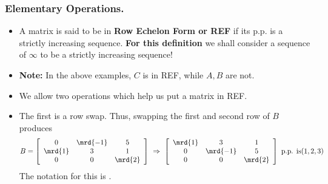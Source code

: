 \begin{frame}%
  \frametitle{Elementary Operations.}
  \begin{itemize}%
 
\item A matrix is said to be in {\bf Row Echelon Form or REF} if its
p.p. is a strictly  increasing sequence.
{\bf For this definition} we shall consider a sequence of $\infty$ to be
a strictly increasing sequence!

\item 
{\bf Note:} In the above examples, $C$ is in REF, while $A,B$ are not.

\item We allow two operations which help us put a matrix in REF.

\item The first is a row swap. Thus, swapping the first and second row
of $B$ produces
$$B= \left[
 \begin{array}{ccc}
 0 & \mrd{-1} & 5 \\
 \mrd{1} & 3 & 1 \\
 0 & 0 & \mrd{2}\\
 \end{array}\right]
 ~\Rightarrow~
 \left[
 \begin{array}{ccc}
 \mrd{1} & 3 & 1 \\
 0 & \mrd{-1} & 5 \\
 0 & 0 &\mrd{2}\\
 \end{array}\right] \mbox{ p.p. is} (1,2,3)$$
The notation for this is .
\end{itemize}

\end{frame}


